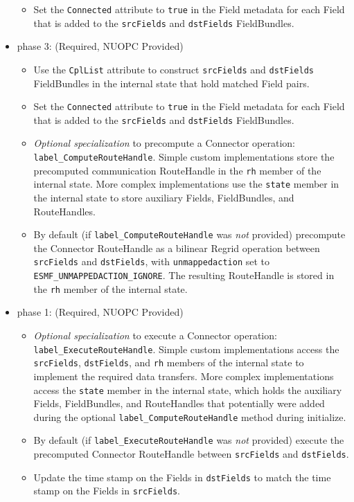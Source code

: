 \begin{itemize}
\begin{itemize}
  \item Set the {\tt Connected} attribute to {\tt true} in the Field metadata for each Field that is added to the {\tt srcFields} and {\tt dstFields} FieldBundles.
  \end{itemize}  
\item phase 3: ({\sc Required, NUOPC Provided})
  \begin{itemize}
  \item Use the {\tt CplList} attribute to construct {\tt srcFields} and {\tt dstFields} FieldBundles in the internal state that hold matched Field pairs.
  \item Set the {\tt Connected} attribute to {\tt true} in the Field metadata for each Field that is added to the {\tt srcFields} and {\tt dstFields} FieldBundles.
  \item {\it Optional specialization} to precompute a Connector operation: {\tt label\_ComputeRouteHandle}. Simple custom implementations store the precomputed communication RouteHandle in the {\tt rh} member of the internal state. More complex implementations use the {\tt state} member in the internal state to store auxiliary Fields, FieldBundles, and RouteHandles.
  \item By default (if {\tt label\_ComputeRouteHandle} was {\em not} provided) precompute the Connector RouteHandle as a bilinear Regrid operation between {\tt srcFields} and {\tt dstFields}, with {\tt unmappedaction} set to {\tt ESMF\_UNMAPPEDACTION\_IGNORE}. The resulting RouteHandle is stored in the {\tt rh} member of the internal state.
  \end{itemize}  
\end{itemize}

\begin{itemize}
\item phase 1: ({\sc Required, NUOPC Provided})
  \begin{itemize}
  \item {\it Optional specialization} to execute a Connector operation: {\tt label\_ExecuteRouteHandle}. Simple custom implementations access the {\tt srcFields}, {\tt dstFields}, and {\tt rh} members of the internal state to implement the required data transfers. More complex implementations access the {\tt state} member in the internal state, which holds the auxiliary Fields, FieldBundles, and RouteHandles that potentially were added during the optional {\tt label\_ComputeRouteHandle} method during initialize.
  \item By default (if {\tt label\_ExecuteRouteHandle} was {\em not} provided) execute the precomputed Connector RouteHandle between {\tt srcFields} and {\tt dstFields}.
  \item Update the time stamp on the Fields in {\tt dstFields} to match the time stamp on the Fields in {\tt srcFields}.
  \end{itemize}    
\end{itemize}

